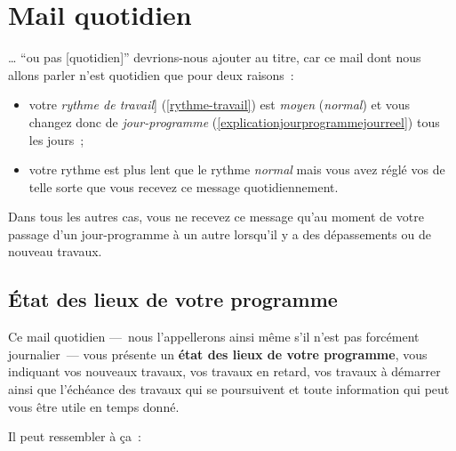% 
% 
% 
% 
% 
% 
% 
% 

\section{Mail quotidien}\hypertarget{mail-quotidien}{}\label{mail-quotidien}

… ``ou pas [quotidien]'' devrions-nous ajouter au titre, car ce mail dont nous allons parler n'est quotidien que pour deux raisons~{}:

\begin{itemize}
\item votre \emph{rythme de travail}] (\ref{rythme-travail}) est \emph{moyen} (\emph{normal}) et vous changez donc de \emph{jour-programme} (\ref{explicationjourprogrammejourreel}) tous les jours~{};
\item votre rythme est plus lent que le rythme \emph{normal} mais vous avez réglé vos \preferences{} de telle sorte que vous recevez ce message quotidiennement.
\end{itemize}

Dans tous les autres cas, vous ne recevez ce message qu'au moment de votre passage d'un jour-programme à un autre lorsqu'il y a des dépassements ou de nouveau travaux.

\subsection{État des lieux de votre programme}\hypertarget{tat-des-lieux-de-votre-programme}{}\label{tat-des-lieux-de-votre-programme}

Ce mail quotidien —~{}nous l'appellerons ainsi même s'il n'est pas forcément journalier~{}— vous présente un \textbf{état des lieux de votre programme}, vous indiquant vos nouveaux travaux, vos travaux en retard, vos travaux à démarrer ainsi que l'échéance des travaux qui se poursuivent et toute information qui peut vous être utile en temps donné.

Il peut ressembler à ça~{}:

\begin{center}
\end{center}

